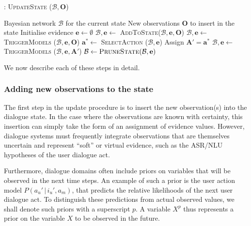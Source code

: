 \begin{algorithm}[ht]
\caption{: \textsc{UpdateState} ($\mathcal{B}, \mathbf{O}$)}
\begin{algorithmic}[1] \vspace{1mm}
\REQUIRE Bayesian network $\mathcal{B}$ for the current state
\REQUIRE New observations $\mathbf{O}$ to insert in the state \vspace{1mm}
\STATE Initialise evidence $\mathbf{e} \leftarrow \emptyset$
\STATE $\mathcal{B}, \mathbf{e} \leftarrow $ \textsc{AddToState}($\mathcal{B}, \mathbf{e}, \mathbf{O}$)
\STATE $\mathcal{B}, \mathbf{e} \leftarrow$ \textsc{TriggerModels} ($\mathcal{B}, \mathbf{e},  \mathbf{O}$) \vspace{1mm}
\STATE $\mathbf{a}^* \leftarrow $ \textsc{SelectAction} ($\mathcal{B}, \mathbf{e}$)
\STATE Assign $\mathbf{A}' = \mathbf{a}^*$
\STATE $\mathcal{B}, \mathbf{e} \leftarrow$ \textsc{TriggerModels} ($\mathcal{B}, \mathbf{e}, \mathbf{A}'$)
\ENDWHILE \vspace{1mm}
\STATE $\mathcal{B} \leftarrow \textsc{PruneState} (\mathcal{B}, \mathbf{e})$ \vspace{1mm}
\end{algorithmic}
\label{algo:stateupdate}
\end{algorithm}

We now describe each of these steps in detail.

\subsubsection*{Adding new observations to the state}

The first step in the update procedure is to insert the new observation(s) into the dialogue state.  In the case where the observations are known with certainty, this insertion can simply take the form of an assignment of evidence values.  However, dialogue systems must frequently integrate observations that are themselves uncertain and represent ``soft'' or virtual evidence, such as the ASR/NLU hypotheses of the user dialogue act.

Furthermore, dialogue domains often include priors on variables that will be observed in the next time steps.  An example of such a prior is the user action model $P(a_u' \, | \, i_u', a_m)$, that predicts the relative likelihoods of the next user dialogue act.  To distinguish these predictions from actual observed values, we shall denote such priors  with a superscript $p$. A variable $X^p$ thus represents a prior on the variable $X$ to be observed in the future.

